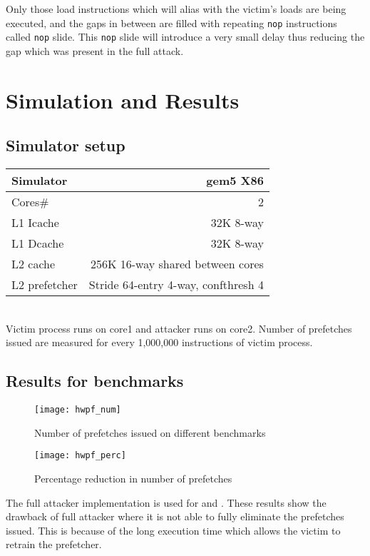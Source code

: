 Only those load instructions which will alias with the victim's loads are
being executed, and the gaps in between are filled with repeating \texttt{nop}
instructions called \texttt{nop} slide. This \texttt{nop} slide will introduce
a very small delay thus reducing the gap which was present in the full attack.

\pagebreak
\section{Simulation and Results}

\subsection{Simulator setup}

\begin{tabular}{|l|r|}
\hline
Simulator  & gem5 X86\\
\hline
Cores#  & 2\\
\hline
L1 Icache & 32K 8-way\\
\hline
L1 Dcache & 32K 8-way\\
\hline
L2 cache & 256K 16-way shared between cores\\
\hline
L2 prefetcher  & Stride 64-entry 4-way, confthresh 4\\
\hline
\end{tabular}
\\

Victim process runs on core1 and attacker runs on core2. Number of prefetches
issued are measured for every 1,000,000 instructions of victim process.

\subsection{Results for benchmarks}

\begin{figure}[h]
    \centering
    \texttt{[image: hwpf\_num]}
    \caption{Number of prefetches issued on different benchmarks}
    \label{fig:prefetch_attack}
\end{figure}

\begin{figure}[h]
    \centering
    \texttt{[image: hwpf\_perc]}
    \caption{Percentage reduction in number of prefetches}
    \label{fig:prefetch_percred}
\end{figure}

The full attacker implementation is used for  and
.
These results show the drawback of full attacker where it is not able to
fully eliminate the prefetches issued. This is because of the long execution
time which allows the victim to retrain the prefetcher.

